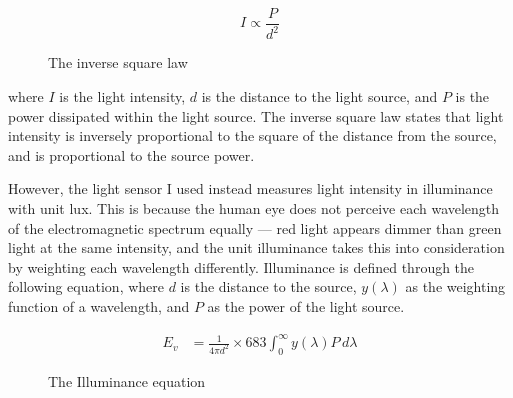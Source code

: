 \documentclass[a4paper,12pt]{article}
\begin{document}



\begin{figure}[h!]
    \[
    I \propto \frac{P}{d^2}
    \]
    \caption{The inverse square law}
    \label{eq:isl}
\end{figure}

where $I$ is the light intensity, $d$ is the distance to the light source, and $P$ is the power dissipated within the light source. The inverse square law states that light intensity is inversely proportional to the square of the distance from the source, and is proportional to the source power.

However, the light sensor I used instead measures light intensity in illuminance with unit lux. This is because the human eye does not perceive each wavelength of the electromagnetic spectrum equally --- red light appears dimmer than green light at the same intensity, and the unit illuminance takes this into consideration by weighting each wavelength differently. Illuminance is defined through the following equation, where $d$ is the distance to the source, $y(\lambda)$ as the weighting function of a wavelength, and $P$ as the power of the light source.

\begin{figure}[h!]
    \centering
    \begin{align*}
        E_v &= \frac{1}{4\pi d^2} \times 683 \int_{0}^{\infty} y(\lambda) P \, d\lambda
    \end{align*}
    \caption{The Illuminance equation}
    \label{eq:dti}
\end{figure}
\end{document}
